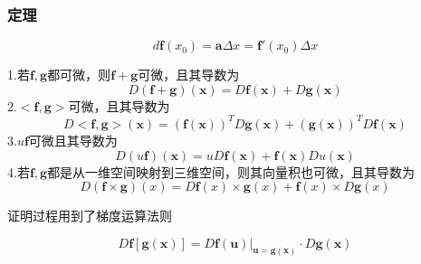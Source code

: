 \subsubsection{定理}
\begin{theorem}
	\begin{equation}\label{key}
		d\bm{f}(x_0)=\bm{a}\Delta x=\bm{f}'(x_0)\Delta x
	\end{equation}
\end{theorem}
\begin{theorem}[微分运算法则]
	1.若$ \bm{f},\bm{g} $都可微，则$ \bm{f}+\bm{g} $可微，且其导数为
	\begin{equation}\label{key}
		D(\bm{f}+\bm{g})(\bm{x})=D\bm{f}(\bm{x})+D\bm{g}(\bm{x})
	\end{equation}
2.$< \bm{f},\bm{g} >$可微，且其导数为
\begin{equation}\label{key}
	D<\bm{f},\bm{g}>(\bm{x})=(\bm{f}(\bm{x}))^TD\bm{g}(\bm{x})+(\bm{g}(\bm{x}))^TD\bm{f}(\bm{x})
\end{equation}
3.$ u\bm{f} $可微且其导数为
\begin{equation}\label{key}
	D(u\bm{f})(\bm{x})=uD\bm{f}(\bm{x})+\bm{f}(\bm{x})Du(\bm{x})
\end{equation}
4.若$ \bm{f},\bm{g} $都是从一维空间映射到三维空间，则其向量积也可微，且其导数为
\begin{equation}\label{key}
	D(\bm{f}\times \bm{g})(x)=D\bm{f}(x)\times \bm{g}(x)+\bm{f}(x)\times D\bm{g}(x)
\end{equation}
\end{theorem}
\begin{remark}
	证明过程用到了梯度运算法则
\end{remark}
\begin{theorem}[向量值复合函数的链式法则]
\begin{equation}\label{key}
		D\bm{f}[\bm{g}(\bm{x})]=D\bm{f}(\bm{u})|_{\bm{u}=\bm{g}(\bm{x})}\cdot D\bm{g}(\bm{x})
\end{equation}
\end{theorem}
